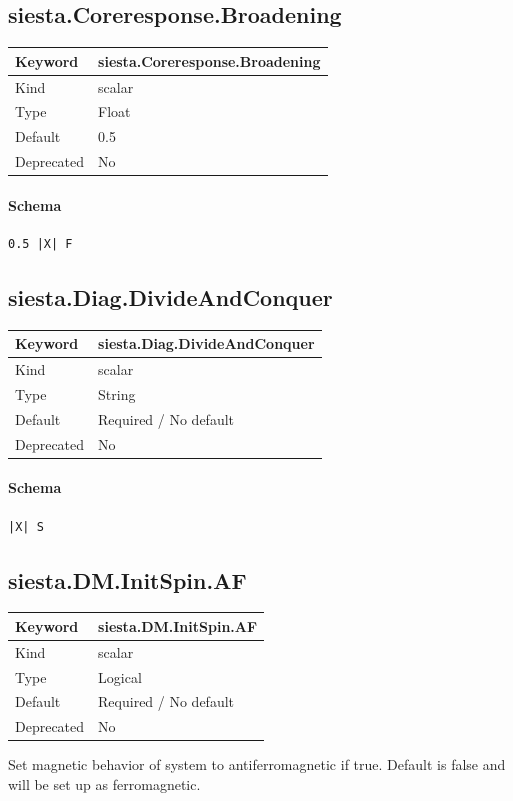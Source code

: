 \documentclass[11pt]{article}
\begin{document}
{{{{{\subsection{siesta.Coreresponse.Broadening}
\label{kw:siesta-Coreresponse-Broadening}
\begin{longtable}{|p{1.5in}|p{4.5in}|}
\hline
Keyword & siesta.Coreresponse.Broadening \\
\hline
Kind & scalar \\
\hline
Type & Float \\
\hline
Default & 0.5 \\
\hline
Deprecated & No \\
\hline
\end{longtable}
\paragraph{Schema}
\begin{Verbatim}
0.5 |X| F
\end{Verbatim}

\subsection{siesta.Diag.DivideAndConquer}
\label{kw:siesta-Diag-DivideAndConquer}
\begin{longtable}{|p{1.5in}|p{4.5in}|}
\hline
Keyword & siesta.Diag.DivideAndConquer \\
\hline
Kind & scalar \\
\hline
Type & String \\
\hline
Default & Required / No default \\
\hline
Deprecated & No \\
\hline
\end{longtable}
\paragraph{Schema}
\begin{Verbatim}
|X| S
\end{Verbatim}

\subsection{siesta.DM.InitSpin.AF}
\label{kw:siesta-DM-InitSpin-AF}
\begin{longtable}{|p{1.5in}|p{4.5in}|}
\hline
Keyword & siesta.DM.InitSpin.AF \\
\hline
Kind & scalar \\
\hline
Type & Logical \\
\hline
Default & Required / No default \\
\hline
Deprecated & No \\
\hline
\end{longtable}
 Set magnetic behavior of system to antiferromagnetic if true.
 Default is false and will be set up as ferromagnetic.

}}}}}
\end{document}
